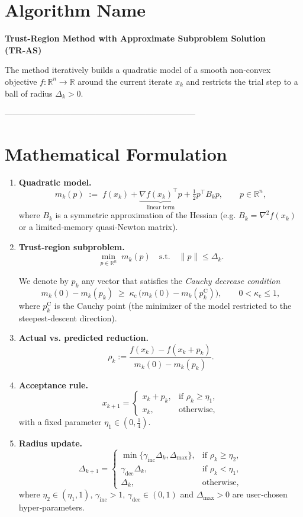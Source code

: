 \documentclass{article}
\begin{document}
\section*{Algorithm Name}
\textbf{Trust‑Region Method with Approximate Subproblem Solution (TR‑AS)}  

The method iteratively builds a quadratic model of a smooth non‑convex objective
\(f:\mathbb{R}^{n}\to\mathbb{R}\) around the current iterate \(x_{k}\) and
restricts the trial step to a ball of radius \(\Delta_{k}>0\).

---------------------------------------------------------------------

\section*{Mathematical Formulation}
\begin{enumerate}[label=\arabic*.]
\item \textbf{Quadratic model.}  
\[
m_{k}(p)\;:=\;f(x_{k})+\underbrace{\nabla f(x_{k})^{\top}p}_{\text{linear term}}
+\tfrac12 p^{\top}B_{k}p,
\qquad p\in\mathbb{R}^{n},
\]
where \(B_{k}\) is a symmetric approximation of the Hessian
(e.g. \(B_{k}=\nabla^{2}f(x_{k})\) or a limited‑memory quasi‑Newton matrix).

\item \textbf{Trust‑region subproblem.}  
\[
\min_{p\in\mathbb{R}^{n}}\; m_{k}(p)\quad\text{s.t.}\quad \|p\|\le\Delta_{k}.
\tag{TR}
\]

We denote by \(p_{k}\) any vector that satisfies the \emph{Cauchy
decrease condition}
\[
m_{k}(0)-m_{k}(p_{k})\;\ge\;\kappa_{\mathrm{c}}\,
\bigl(m_{k}(0)-m_{k}(p^{\mathrm{C}}_{k})\bigr),
\qquad 0<\kappa_{\mathrm{c}}\le 1,
\tag{1}
\]
where \(p^{\mathrm{C}}_{k}\) is the Cauchy point (the minimizer of the model
restricted to the steepest‑descent direction).

\item \textbf{Actual vs. predicted reduction.}  
\[
\rho_{k}
:=\frac{f(x_{k})-f(x_{k}+p_{k})}{m_{k}(0)-m_{k}(p_{k})}.
\tag{2}
\]

\item \textbf{Acceptance rule.}  
\[
x_{k+1}=
\begin{cases}
x_{k}+p_{k}, & \text{if }\rho_{k}\ge \eta_{1},\\[4pt]
x_{k}, & \text{otherwise},
\end{cases}
\tag{3}
\]
with a fixed parameter \(\eta_{1}\in(0,\tfrac14)\).

\item \textbf{Radius update.}  
\[
\Delta_{k+1}=
\begin{cases}
\min\{\gamma_{\mathrm{inc}}\Delta_{k},\Delta_{\max}\},
& \text{if }\rho_{k}\ge \eta_{2},\\[4pt]
\gamma_{\mathrm{dec}}\Delta_{k},
& \text{if }\rho_{k}<\eta_{1},\\[4pt]
\Delta_{k},
& \text{otherwise},
\end{cases}
\tag{4}
\]
where \(\eta_{2}\in(\eta_{1},1)\), \(\gamma_{\mathrm{inc}}>1\),
\(\gamma_{\mathrm{dec}}\in(0,1)\) and \(\Delta_{\max}>0\) are user‑chosen
hyper‑parameters.

\end{enumerate}
\end{document}
